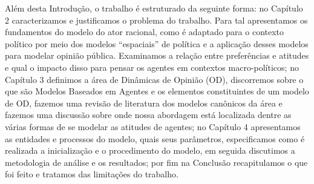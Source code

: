 Além desta Introdução, o trabalho é estruturado da seguinte forma: no Capítulo 2
caracterizamos e justificamos o problema do trabalho. Para tal apresentamos os
fundamentos do modelo do ator racional, como é adaptado para o contexto político
por meio dos modelos ``espaciais'' de política e a aplicação desses modelos para
modelar opinião pública. Examinamos a relação entre preferências e atitudes e
qual o impacto disso para pensar os agentes em contextos macro-políticos; no
Capítulo 3 definimos a área de Dinâmicas de Opinião (OD), discorremos sobre o
que são Modelos Baseados em Agentes e os elementos constituintes de um modelo de
OD, fazemos uma revisão de literatura dos modelos canônicos da área e fazemos
uma discussão sobre onde nossa abordagem está localizada dentre as várias formas
de se modelar as atitudes de agentes; no Capítulo 4 apresentamos as entidades e
processos do modelo, quais seus parâmetros, especificamos como é realizada a
inicialização e o procedimento do modelo, em seguida discutimos a metodologia de
análise e os resultados; por fim na Conclusão recapitulamos o que foi feito e
tratamos das limitações do trabalho.








